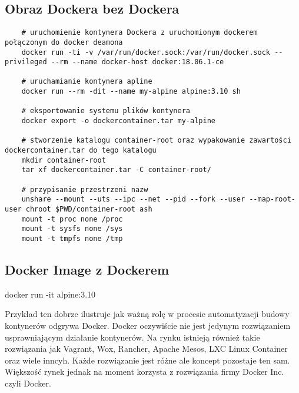 \subsection{Obraz Dockera bez Dockera}
\begin{verbatim}
    # uruchomienie kontynera Dockera z uruchomionym dockerem połączonym do docker deamona
    docker run -ti -v /var/run/docker.sock:/var/run/docker.sock --privileged --rm --name docker-host docker:18.06.1-ce

    # uruchamianie kontynera apline 
    docker run --rm -dit --name my-alpine alpine:3.10 sh

    # eksportowanie systemu plików kontynera
    docker export -o dockercontainer.tar my-alpine

    # stworzenie katalogu container-root oraz wypakowanie zawartości dockercontainer.tar do tego katalogu
    mkdir container-root
    tar xf dockercontainer.tar -C container-root/

    # przypisanie przestrzeni nazw
    unshare --mount --uts --ipc --net --pid --fork --user --map-root-user chroot $PWD/container-root ash 
    mount -t proc none /proc
    mount -t sysfs none /sys
    mount -t tmpfs none /tmp

\end{verbatim}

\subsection{Docker Image z Dockerem}
docker run -it alpine:3.10

Przykład ten dobrze ilustruje jak ważną rolę w procesie automatyzacji budowy kontynerów odgrywa Docker.
Docker oczywiście nie jest jedynym rozwiązaniem usprawniającym działanie kontynerów. Na rynku istnieją również takie rozwiązania jak Vagrant, Wox, Rancher, Apache Mesos, LXC Linux Container oraz wiele inncyh. Każde rozwiązanie jest różne ale koncept pozostaje ten sam. Większość rynek jednak na moment korzysta z rozwiązania firmy Docker Inc. czyli Docker.


